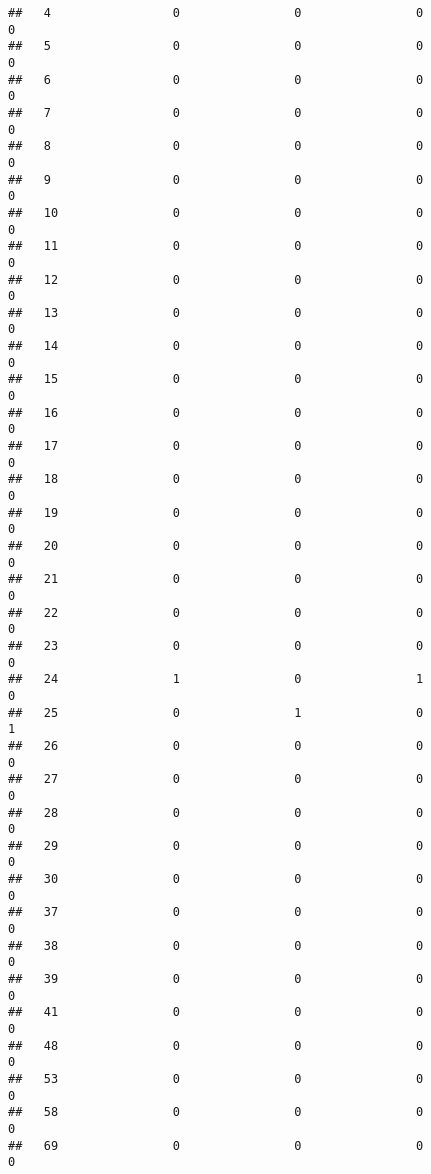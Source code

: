 \documentclass[]{article}
\begin{document}
\begin{verbatim}
##   4                 0                0                0                0
##   5                 0                0                0                0
##   6                 0                0                0                0
##   7                 0                0                0                0
##   8                 0                0                0                0
##   9                 0                0                0                0
##   10                0                0                0                0
##   11                0                0                0                0
##   12                0                0                0                0
##   13                0                0                0                0
##   14                0                0                0                0
##   15                0                0                0                0
##   16                0                0                0                0
##   17                0                0                0                0
##   18                0                0                0                0
##   19                0                0                0                0
##   20                0                0                0                0
##   21                0                0                0                0
##   22                0                0                0                0
##   23                0                0                0                0
##   24                1                0                1                0
##   25                0                1                0                1
##   26                0                0                0                0
##   27                0                0                0                0
##   28                0                0                0                0
##   29                0                0                0                0
##   30                0                0                0                0
##   37                0                0                0                0
##   38                0                0                0                0
##   39                0                0                0                0
##   41                0                0                0                0
##   48                0                0                0                0
##   53                0                0                0                0
##   58                0                0                0                0
##   69                0                0                0                0

\end{verbatim}
\end{document}
